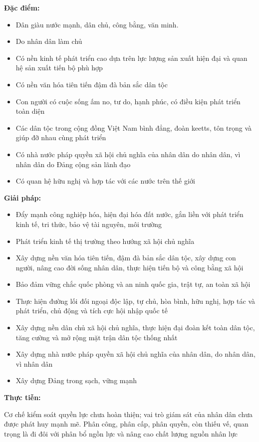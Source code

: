 \textbf{Đặc điểm:} 
\begin{itemize}
    \item Dân giàu nước mạnh, dân chủ, công bằng, văn minh.
    \item Do nhân dân làm chủ
    \item Có nền kinh tế phát triển cao dựa trên lực lượng sản xuất hiện đại và quan hệ sản xuất tiến bộ phù hợp
    \item Có nền văn hóa tiên tiến đậm đà bản sắc dân tộc
    \item Con người có cuộc sống ấm no, tư do, hạnh phúc, có điều kiện phát triển toàn diện
    \item Các dân tộc trong cộng đồng Việt Nam  bình đẳng, đoàn keetts, tôn trọng và giúp đỡ nhau cùng phát triển
    \item Có nhà nước pháp quyền xã hội chủ nghĩa của nhân dân do nhân dân, vì nhân dân do Đảng cộng sản lãnh đạo
    \item Có quan hệ hữu nghị và hợp tác với các nước trên thế giới
\end{itemize}
\hspace{1cm}\textbf{Giải pháp:}
\begin{itemize}
    \item Đẩy mạnh công nghiệp hóa, hiện đại hóa đất nước, gắn liền với phát triển kinh tế, tri thức, bảo vệ tài nguyên, môi trường
    \item Phát triển kinh tế thị trường theo hướng xã hội chủ nghĩa
    \item Xây dựng nền văn hóa tiên tiến, đậm đà bản sắc dân tộc, xây dựng con người, nâng cao đời sống nhân dân, thực hiện tiến bộ và công bằng xã hội
    \item Bảo đảm vững chắc quốc phòng và an ninh quốc gia, trật tự, an toàn xã hội
    \item Thực hiện đường lối đối ngoại độc lập, tự chủ, hòa bình, hữu nghị, hợp tác và phát triển, chủ động và tích cực hội nhập quốc tế
    \item Xây dựng nền dân chủ xã hội chủ nghĩa, thực hiện đại đoàn kết toàn dân tộc, tăng cường và mở rộng mặt trận dân tộc thống nhất
    \item Xây dựng nhà nước pháp quyền xã hội chủ nghĩa của nhân dân, do nhân dân, vì nhân dân
    \item Xây dựng Đảng trong sạch, vững mạnh
\end{itemize}
\hspace{1cm}\textbf{Thực tiễn:} 

Cơ chế kiểm soát quyền lực chưa hoàn thiện; vai trò giám sát của nhân dân chưa được phát huy mạnh mẽ. Phân công, phân cấp, phân quyền, còn thiếu vế, quan trọng là đi đôi với phân bổ ngồn lực và nâng cao chất lượng nguồn nhân lực

